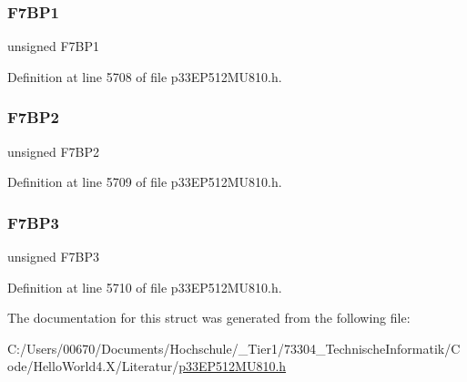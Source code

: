 \subsubsection{\texorpdfstring{F7\+B\+P1}{F7BP1}}
{\footnotesize\ttfamily unsigned F7\+B\+P1}



Definition at line 5708 of file p33\+E\+P512\+M\+U810.\+h.

\mbox{\label{structtag_c2_b_u_f_p_n_t2_b_i_t_s_ad17ad8a4e0bdc19525382cdbd924ad5c}} 
\subsubsection{\texorpdfstring{F7\+B\+P2}{F7BP2}}
{\footnotesize\ttfamily unsigned F7\+B\+P2}



Definition at line 5709 of file p33\+E\+P512\+M\+U810.\+h.

\mbox{\label{structtag_c2_b_u_f_p_n_t2_b_i_t_s_aad9539f9fb073db359d4b0c4ec752456}} 
\subsubsection{\texorpdfstring{F7\+B\+P3}{F7BP3}}
{\footnotesize\ttfamily unsigned F7\+B\+P3}



Definition at line 5710 of file p33\+E\+P512\+M\+U810.\+h.



The documentation for this struct was generated from the following file\+:\begin{DoxyCompactItemize}
\item 
C\+:/\+Users/00670/\+Documents/\+Hochschule/\+\_\+\+Tier1/73304\+\_\+\+Technische\+Informatik/\+Code/\+Hello\+World4.\+X/\+Literatur/\hyperlink{p33_e_p512_m_u810_8h}{p33\+E\+P512\+M\+U810.\+h}\end{DoxyCompactItemize}
